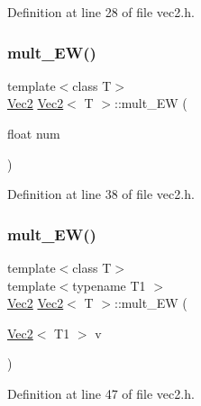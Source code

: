 Definition at line 28 of file vec2.\+h.

\mbox{\label{class_vec2_ac200080cc1d4f4433e5405030c3cae83}} 
\subsubsection{\texorpdfstring{mult\_EW()}{mult\_EW()}\hspace{0.1cm}{\footnotesize\ttfamily [1/2]}}
{\footnotesize\ttfamily template$<$class T$>$ \\
\mbox{\hyperlink{class_vec2}{Vec2}} \mbox{\hyperlink{class_vec2}{Vec2}}$<$ T $>$\+::mult\+\_\+\+EW (\begin{DoxyParamCaption}\item[{float}]{num }\end{DoxyParamCaption})\hspace{0.3cm}{\ttfamily [inline]}}



Definition at line 38 of file vec2.\+h.

\mbox{\label{class_vec2_ad43121f0be39c026011cd69e8b8128f3}} 
\subsubsection{\texorpdfstring{mult\_EW()}{mult\_EW()}\hspace{0.1cm}{\footnotesize\ttfamily [2/2]}}
{\footnotesize\ttfamily template$<$class T$>$ \\
template$<$typename T1 $>$ \\
\mbox{\hyperlink{class_vec2}{Vec2}} \mbox{\hyperlink{class_vec2}{Vec2}}$<$ T $>$\+::mult\+\_\+\+EW (\begin{DoxyParamCaption}\item[{\mbox{\hyperlink{class_vec2}{Vec2}}$<$ T1 $>$}]{v }\end{DoxyParamCaption})\hspace{0.3cm}{\ttfamily [inline]}}



Definition at line 47 of file vec2.\+h.

\mbox{\label{class_vec2_a16c52782cb8291707149491c11eb9763}} 
